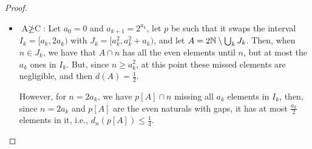 \begin{proof}
\begin{itemize}
        \item $\text{A}\not\geq\text{C}$: Let $a_0=0$ and $a_{k+1}=2^{a_k}$, let $p$ be such that it swaps the interval $I_k=[a_k,2a_k)$ with $J_k=[a_k^2,a_k^2+a_k)$, and let $A=2\mathbb{N}\setminus\bigcup_k J_k$. Then, when $n\in J_k$, we have that
        $A\cap n$ has all the even elements until $n$, but at most the $a_k$ ones in $I_k$. But, since $n\geq a_k^2$, at this point these missed elements are negligible, and then $d(A)=\frac12$.

        However, for $n=2a_k$, we have $p[A]\cap n$ missing all $a_k$ elements in $I_k$, then, since $n=2a_k$ and $p[A]$ are the even naturals with gaps, it has at most $\frac{a_k}{2}$ elements in it, i.e., $d_n(p[A])\leq\frac14$.
    \end{itemize}
\end{proof}
